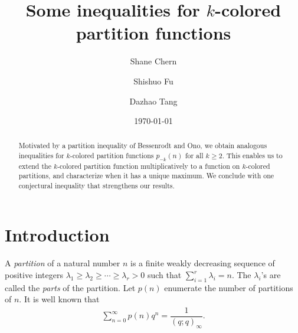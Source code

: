 \documentclass[12pt,reqno]{amsart}
\numberwithin{equation}{section}
\theoremstyle{plain}
\theoremstyle{definition}
\begin{document}
\title[Some inequalities for $k$-colored partition functions]{Some inequalities for $k$-colored partition functions}

\author[S. Chern]{Shane Chern}
\address[Shane Chern]{Department of Mathematics, The Pennsylvania State University, University Park, PA 16802, USA}

\author[S. Fu]{Shishuo Fu}
\address[Shishuo Fu]{College of Mathematics and Statistics, Chongqing University, Huxi Campus LD506, Chongqing 401331, P.R. China}

\author[D. Tang]{Dazhao Tang}

\address[Dazhao Tang]{College of Mathematics and Statistics, Chongqing University, Huxi Campus LD206, Chongqing 401331, P.R. China}

\date{\today}


\begin{abstract}
Motivated by a partition inequality of Bessenrodt and Ono, we obtain analogous inequalities for $k$-colored partition functions $p_{-k}(n)$ for all $k\geq2$. This enables us to extend the $k$-colored partition function multiplicatively to a function on $k$-colored partitions, and characterize when it has a unique maximum. We conclude with one conjectural inequality that strengthens our results.
\end{abstract}




\maketitle



\section{Introduction}\label{sec1}
A \emph{partition} \cite{Andr1976} of a natural number $n$ is a finite weakly decreasing sequence of positive integers $\lambda_{1}\geq\lambda_{2}\geq\cdots\geq\lambda_{r}>0$ such that $\sum_{i=1}^{r}\lambda_{i}=n$. The $\lambda_{i}$'s are called the \emph{parts} of the partition. Let $p(n)$ enumerate the number of partitions of $n$. It is well known that
\begin{align}\label{ordi part func}
\sum_{n=0}^{\infty}p(n)q^{n}=\dfrac{1}{(q;q)_{\infty}}.
\end{align}
\end{document}
